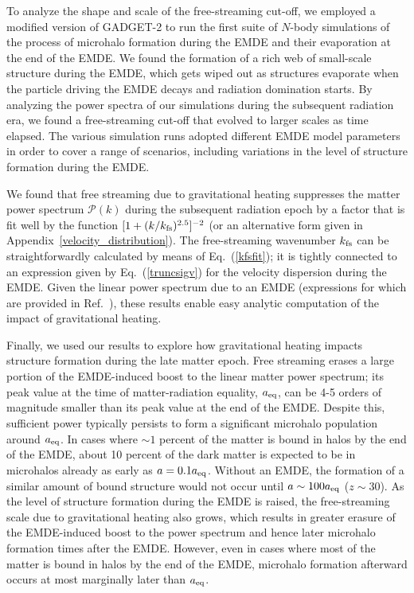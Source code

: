 \documentclass[a4paper,11pt]{article}
\newcommand{\kfs}{k_{\rm fs}}
\newcommand{\aeq}{a_{\rm eq}}
\begin{document}
To analyze the shape and scale of the free-streaming cut-off, we employed a modified version of \textsc{GADGET-2} to run the first suite of $N$-body simulations of the process of microhalo formation during the EMDE and their evaporation at the end of the EMDE. We found the formation of a rich web of small-scale structure during the EMDE, which gets wiped out as structures evaporate when the particle driving the EMDE decays and radiation domination starts.
By analyzing the power spectra of our simulations during the subsequent radiation era, we found a free-streaming cut-off that evolved to larger scales as time elapsed.
The various simulation runs adopted different EMDE model parameters in order to cover a range of scenarios, including variations in the level of structure formation during the EMDE.


We found that free streaming due to gravitational heating suppresses the matter power spectrum $\mathcal{P}(k)$ during the subsequent radiation epoch by a factor that is fit well by the function $[1 + (k/\kfs)^{2.5}]^{-2}$ (or an alternative form given in Appendix~\ref{velocity_distribution}).
The free-streaming wavenumber $\kfs$ can be straightforwardly calculated by means of Eq.~(\ref{kfsfit}); it is tightly connected to an expression given by Eq.~(\ref{truncsigv}) for the velocity dispersion during the EMDE.
Given the linear power spectrum due to an EMDE (expressions for which are provided in Ref.~\cite{hg23}), these results enable easy analytic computation of the impact of gravitational heating.


Finally, we used our results to explore how gravitational heating impacts structure formation during the late matter epoch. Free streaming erases a large portion of the EMDE-induced boost to the linear matter power spectrum; its peak value at the time of matter-radiation equality, $\aeq$, can be 4-5 orders of magnitude smaller than its peak value at the end of the EMDE. Despite this, sufficient power typically persists to form a significant microhalo population around $\aeq$.
In cases where $\sim 1$ percent of the matter is bound in halos by the end of the EMDE, about 10 percent of the dark matter is expected to be in microhalos already as early as $a=0.1\aeq$. Without an EMDE, the formation of a similar amount of bound structure would not occur until $a\sim 100\aeq$ ($z\sim 30$).
As the level of structure formation during the EMDE is raised, the free-streaming scale due to gravitational heating also grows, which results in greater erasure of the EMDE-induced boost to the power spectrum and hence later microhalo formation times after the EMDE. However, even in cases where most of the matter is bound in halos by the end of the EMDE, microhalo formation afterward occurs at most marginally later than $\aeq$.
\end{document}
